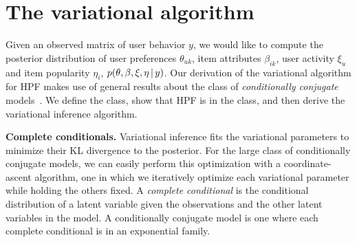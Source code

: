 \section{The variational algorithm}
Given an observed matrix of user behavior $y$, we would like to
compute the posterior distribution of user preferences $\theta_{uk}$,
item attributes $\beta_{ik}$, user activity $\xi_u$ and item
popularity $\eta_i$, $p(\theta, \beta, \xi, \eta \,\vert\, y)$.  Our
derivation of the variational algorithm for HPF makes use of
general results about the class of \textit{conditionally conjugate}
models~\cite{Ghahramani:2001,Hoffman:2013}.  We define the class, show
that HPF is in the class, and then derive the variational
inference algorithm.

{\bf Complete conditionals.}  Variational inference fits the
variational parameters to minimize their KL divergence to the
posterior. For the large class of conditionally conjugate models, we
can easily perform this optimization with a coordinate-ascent
algorithm, one in which we iteratively optimize each variational
parameter while holding the others fixed.  A \textit{complete
conditional} is the conditional distribution of a latent variable
given the observations and the other latent variables in the model.  A
conditionally conjugate model is one where each complete conditional
is in an exponential family.

